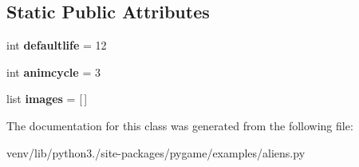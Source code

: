 \subsection*{Static Public Attributes}
\begin{DoxyCompactItemize}
\item 
\mbox{\label{classpygame_1_1examples_1_1aliens_1_1_explosion_a5a1c84cb00411e9725f21c5eb9ed3597}} 
int {\bfseries defaultlife} = 12
\item 
\mbox{\label{classpygame_1_1examples_1_1aliens_1_1_explosion_a46c1cae6fd3f9c9bdecf995ece1e9c6f}} 
int {\bfseries animcycle} = 3
\item 
\mbox{\label{classpygame_1_1examples_1_1aliens_1_1_explosion_a5396775dfef11599a4a559482a10c28b}} 
list {\bfseries images} = \mbox{[}$\,$\mbox{]}
\end{DoxyCompactItemize}


The documentation for this class was generated from the following file\+:\begin{DoxyCompactItemize}
\item 
venv/lib/python3./site-\/packages/pygame/examples/aliens.\+py\end{DoxyCompactItemize}
